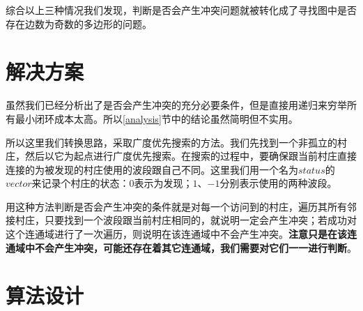 \documentclass[UTF8]{ctexart}
\begin{document}
	\indent 综合以上三种情况我们发现，判断是否会产生冲突问题就被转化成了寻找图中是否存在边数为奇数的多边形的问题。
	
	

	
	\section{解决方案}
		
		\indent 虽然我们已经分析出了是否会产生冲突的充分必要条件，但是直接用递归来穷举所有最小闭环成本太高。所以\ref{analysis}节中的结论虽然简明但不实用。
		
		\indent 所以这里我们转换思路，采取广度优先搜索的方法。我们先找到一个非孤立的村庄，然后以它为起点进行广度优先搜索。在搜索的过程中，要确保跟当前村庄直接连接的为被发现的村庄使用的波段跟自己不同。这里我们用一个名为$status$的$vector$来记录个村庄的状态：$0$表示为发现；$1$、$-1$分别表示使用的两种波段。
		
		\indent 用这种方法判断是否会产生冲突的条件就是对每一个访问到的村庄，遍历其所有邻接村庄，只要找到一个波段跟当前村庄相同的，就说明一定会产生冲突；若成功对这个连通域进行了一次遍历，则说明在该连通域中不会产生冲突。\textbf{注意只是在该连通域中不会产生冲突，可能还存在着其它连通域，我们需要对它们一一进行判断}。
	
	\section{算法设计}
\end{document}
